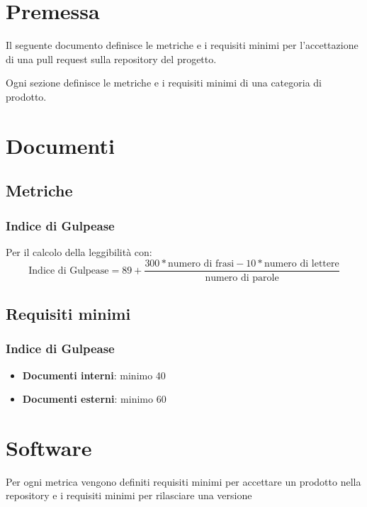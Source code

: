\documentclass[a4paper, 12pt]{article}
\begin{document}
\makefrontpage

\makeversioni

\section{Premessa}
Il seguente documento definisce le metriche e i requisiti minimi per l'accettazione di una pull request sulla repository del progetto. 

Ogni sezione definisce le metriche e i requisiti minimi di una categoria di prodotto.

\section{Documenti}
\subsection{Metriche}
\subsubsection{Indice di Gulpease}
Per il calcolo della leggibilità con:
\[ \text{Indice di Gulpease} = 89 + \frac{300*\text{numero di frasi} - 10*\text{numero di lettere}}{\text{numero di parole}} \]


\subsection{Requisiti minimi}
\subsubsection{Indice di Gulpease}
\begin{itemize}
	\item \textbf{Documenti interni}: minimo 40
	\item \textbf{Documenti esterni}: minimo 60
\end{itemize}

\section{Software}
Per ogni metrica vengono definiti requisiti minimi per accettare un prodotto nella repository e i requisiti minimi per rilasciare una versione
	
\end{document}

